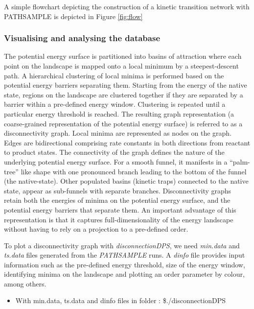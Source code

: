 \documentclass[journal=jacsat]{achemso}
\begin{document}
A simple flowchart depicting the construction of a kinetic transition network with PATHSAMPLE is depicted in Figure \ref{fig:flow}

\subsubsection{Visualising and analysing the database}
The potential energy surface is partitioned into basins of attraction where each point on the landscape is mapped onto a local minimum by a steepest-descent path. A hierarchical clustering of local minima is performed based on the potential energy barriers separating them. Starting from the energy of the native state, regions on the landscape are clustered together if they are separated by a barrier within a pre-defined energy window. Clustering is repeated until a particular energy threshold is reached. The resulting graph representation (a coarse-grained representation of the potential energy surface) is referred to as a disconnectivity graph. Local minima are represented as nodes on the graph. Edges are bidirectional comprising rate constants in both directions from reactant to product states. The connectivity of the graph defines the nature of the underlying potential energy surface. For a smooth funnel, it manifests in a ``palm-tree'' like shape with one pronounced branch leading to the bottom of the funnel (the native-state). Other populated basins (kinetic traps) connected to the native state, appear as sub-funnels with separate branches. Disconnectivity graphs retain both the energies of minima on the potential energy surface, and the potential energy barriers that separate them. An important advantage of this representation is that it captures  full-dimensionality of the energy landscape without having to rely on a projection to a pre-defined order. 

To plot a disconnectivity graph with \emph{disconnectionDPS}, we need  \emph{min.data} and \emph{ts.data} files generated from the \emph{PATHSAMPLE} runs. A \emph{dinfo} file provides input information such as the pre-defined energy threshold, size of the energy window, identifying minima on the landscape and plotting an order parameter by colour, among others. 

\begin{itemize}
\small
    \item {With min.data, ts.data and dinfo files in folder : \$./disconnectionDPS}
\end{itemize}
\end{document}
